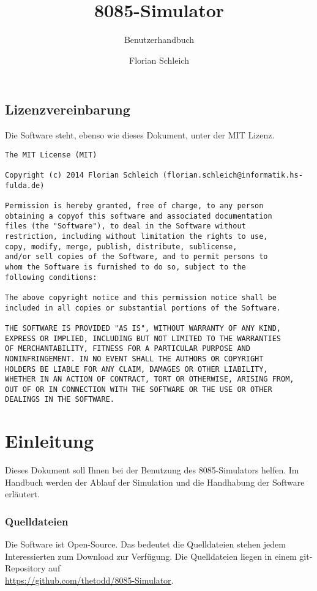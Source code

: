 \documentclass[11pt,a4paper]{hsfuldabook}
\begin{document}
\title{8085-Simulator}
\subtitle{Benutzerhandbuch}
\author{Florian Schleich}
\publishers{}
\uppertitleback{Entwickelt im Rahmen der Lehrveranstaltung "Mikrocontrollerprogrammierung"
an der Hochschule Fulda.}
\maketitle

\section*{Lizenzvereinbarung}
Die Software steht, ebenso wie dieses Dokument, unter der MIT Lizenz.

\begin{verbatim}
The MIT License (MIT)

Copyright (c) 2014 Florian Schleich (florian.schleich@informatik.hs-fulda.de)

Permission is hereby granted, free of charge, to any person
obtaining a copyof this software and associated documentation
files (the "Software"), to deal in the Software without
restriction, including without limitation the rights to use,
copy, modify, merge, publish, distribute, sublicense,
and/or sell copies of the Software, and to permit persons to
whom the Software is furnished to do so, subject to the
following conditions:

The above copyright notice and this permission notice shall be
included in all copies or substantial portions of the Software.

THE SOFTWARE IS PROVIDED "AS IS", WITHOUT WARRANTY OF ANY KIND,
EXPRESS OR IMPLIED, INCLUDING BUT NOT LIMITED TO THE WARRANTIES
OF MERCHANTABILITY, FITNESS FOR A PARTICULAR PURPOSE AND
NONINFRINGEMENT. IN NO EVENT SHALL THE AUTHORS OR COPYRIGHT
HOLDERS BE LIABLE FOR ANY CLAIM, DAMAGES OR OTHER LIABILITY,
WHETHER IN AN ACTION OF CONTRACT, TORT OR OTHERWISE, ARISING FROM,
OUT OF OR IN CONNECTION WITH THE SOFTWARE OR THE USE OR OTHER
DEALINGS IN THE SOFTWARE.
\end{verbatim}

\tableofcontents

\chapter{Einleitung}
Dieses Dokument soll Ihnen bei der Benutzung des 8085-Simulators helfen. Im Handbuch werden der
Ablauf der Simulation und die Handhabung der Software erläutert.

\subsection{Quelldateien}
Die Software ist Open-Source. Das bedeutet die Quelldateien stehen jedem Interessierten zum Download
zur Verfügung. Die Quelldateien liegen in einem git-Repository auf\\
\url{https://github.com/thetodd/8085-Simulator}.
\end{document}
